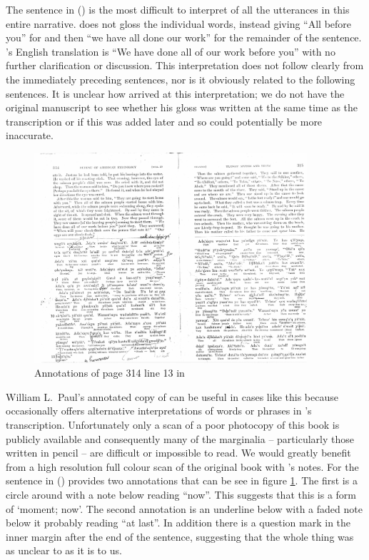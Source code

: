 The sentence in (\lastx) is the most difficult to interpret of all the utterances in this entire narrative.
\citeauthor{swanton:1909} does not gloss the individual words, instead giving “All before you” for  and then “we have all done our work” for the remainder of the sentence.
\citeauthor{swanton:1909}’s English translation is “We have done all of our work before you” with no further clarification or discussion.
This interpretation does not follow clearly from the immediately preceding sentences, nor is it obviously related to the following sentences.
It is unclear how \citeauthor{swanton:1909} arrived at this interpretation; we do not have the original manuscript to see whether his gloss was written at the same time as the transcription or if this was added later and so could potentially be more inaccurate.

\begin{figure}
\centerfloat
\includegraphics[width=0.9\textwidth]{figures/paul-1930-314-13.pdf}
\caption[Annotations of p.\ 314 l.\ 13 in Paul 1930]{Annotations of page 314 line 13 in \cite{paul:1930}}\label{fig:100-91-gweijich-paul-1930}
\end{figure}

 William L.\ Paul’s annotated copy of \cite{swanton:1909} \parencite{paul:1930} can be useful in cases like this because \citeauthor{paul:1930} occasionally offers alternative interpretations of words or phrases in \citeauthor{swanton:1909}’s transcription.
Unfortunately only a scan of a poor photocopy of this book is publicly available and consequently many of the marginalia – particularly those written in pencil – are difficult or impossible to read.
We would greatly benefit from a high resolution full colour scan of the original book with \citeauthor{paul:1930}’s notes.
For the sentence in (\lastx) \citeauthor{paul:1930} provides two annotations that can be see in figure \ref{fig:100-91-gweijich-paul-1930}.
The first is a circle around  with a note below reading “now”.
This suggests that this is a form of  ‘moment; now’.
The second annotation is an underline below  with a faded note below it probably reading “at last”.
In addition there is a question mark in the inner margin after the end of the sentence, suggesting that the whole thing was as unclear to \citeauthor{paul:1930} as it is to us.

